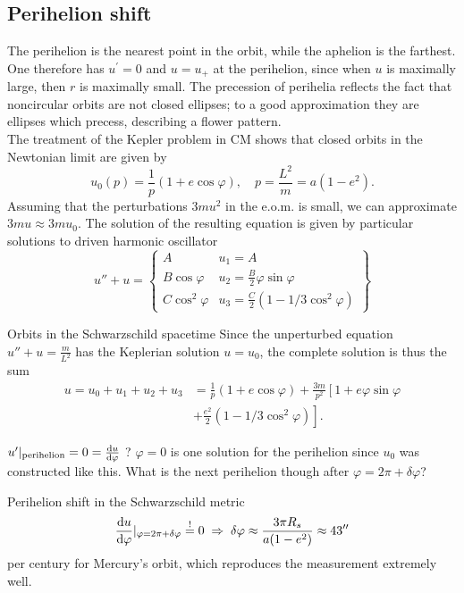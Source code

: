 	\subsection{Perihelion shift}
	The perihelion is the nearest point in the orbit, while the aphelion is the farthest. One therefore has $u^\prime=0$ and $u=u_+$ at the perihelion, since when $u$ is maximally large, then $r$ is maximally small.
		The precession of perihelia reflects the fact that noncircular orbits are
		not closed ellipses; to a good approximation they are ellipses which precess, describing a
		flower pattern.\\
		The treatment of the Kepler problem in CM shows that closed orbits in the Newtonian limit are given by
		\begin{equation}
		u_0 (p) = \frac{1}{p} (1+e \cos \varphi), \quad p=\frac{L^2}{m}=a(1-e^2).
		\end{equation}
		Assuming that the perturbations $3mu^2$ in the e.o.m. is small, we can approximate $3mu \approx 3mu_0$. The solution of the resulting equation is given by particular solutions to driven harmonic oscillator
		\begin{equation}
		u''+u= \left\{\begin{array}{lr}
		A & u_1=A\\
		B \cos \varphi & u_2 = \frac{B}{2} \varphi \sin \varphi\\
		C \cos^2\varphi & u_3 =\frac{C}{2}(1-1/3 \cos^2\varphi)
		\end{array}\right\}
		\end{equation}
		\begin{mybox}{Orbits in the Schwarzschild spacetime}
			Since the unperturbed equation $u''+u=\frac{m}{L^2}$ has the Keplerian solution $u=u_0$, the complete solution is thus the sum
			\begin{align}
				u=u_0+u_1+u_2+u_3&=\frac{1}{p} (1+e \cos \varphi) + \frac{3m}{p^2} \left[1+e \varphi \sin \varphi \right.\nonumber \\
				&\left.  + \frac{e^2}{2} (1-1/3 \cos^2\varphi)\right].
			\end{align}
		\end{mybox}
		$u'|_{\mathrm{perihelion}} = 0= \frac{\mathrm{d} u}{\mathrm{d} \varphi}$ ? $\varphi =0$ is one solution for the perihelion since $u_0$ was constructed like this. What is the next perihelion though after $\varphi = 2 \pi + \delta \varphi$?
		\begin{mybox}{Perihelion shift in the Schwarzschild metric}
			\begin{equation}
			\frac{\mathrm{d} u}{\mathrm{d} \varphi}|_{\varphi = 2 \pi + \delta \varphi} \stackrel{!}{=}0 \; \Rightarrow\; \delta \varphi \approx \frac{3 \pi R_s}{a(1-e^2)} \approx 43''
			\end{equation}
			per century for Mercury's orbit, which reproduces the measurement extremely well.
		\end{mybox}
